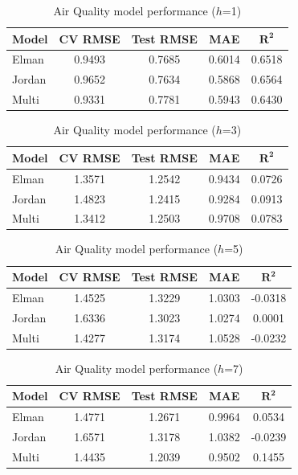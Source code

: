 \documentclass[conference]{IEEEtran}
\begin{document}
\begin{table}[H]
\centering
\caption{Air Quality model performance ($h$=1)}
\label{tab:aq_h1}
\begin{tabular}{lcccc}
\toprule
\textbf{Model} & \textbf{CV RMSE} & \textbf{Test RMSE} & \textbf{MAE} & \(\mathbf{R^2}\) \\
\midrule
Elman  & 0.9493 & 0.7685 & 0.6014 & 0.6518 \\
Jordan & 0.9652 & 0.7634 & 0.5868 & 0.6564 \\
Multi  & 0.9331 & 0.7781 & 0.5943 & 0.6430 \\
\bottomrule
\end{tabular}
\end{table}

\begin{table}[H]
\centering
\caption{Air Quality model performance ($h$=3)}
\label{tab:aq_h3}
\begin{tabular}{lcccc}
\toprule
\textbf{Model} & \textbf{CV RMSE} & \textbf{Test RMSE} & \textbf{MAE} & \(\mathbf{R^2}\) \\
\midrule
Elman  & 1.3571 & 1.2542 & 0.9434 & 0.0726 \\
Jordan & 1.4823 & 1.2415 & 0.9284 & 0.0913 \\
Multi  & 1.3412 & 1.2503 & 0.9708 & 0.0783 \\
\bottomrule
\end{tabular}
\end{table}

\begin{table}[H]
\centering
\caption{Air Quality model performance ($h$=5)}
\label{tab:aq_h5}
\begin{tabular}{lcccc}
\toprule
\textbf{Model} & \textbf{CV RMSE} & \textbf{Test RMSE} & \textbf{MAE} & \(\mathbf{R^2}\) \\
\midrule
Elman  & 1.4525 & 1.3229 & 1.0303 & -0.0318 \\
Jordan & 1.6336 & 1.3023 & 1.0274 & 0.0001 \\
Multi  & 1.4277 & 1.3174 & 1.0528 & -0.0232 \\
\bottomrule
\end{tabular}
\end{table}

\begin{table}[H]
\centering
\caption{Air Quality model performance ($h$=7)}
\label{tab:aq_h7}
\begin{tabular}{lcccc}
\toprule
\textbf{Model} & \textbf{CV RMSE} & \textbf{Test RMSE} & \textbf{MAE} & \(\mathbf{R^2}\) \\
\midrule
Elman  & 1.4771 & 1.2671 & 0.9964 & 0.0534 \\
Jordan & 1.6571 & 1.3178 & 1.0382 & -0.0239 \\
Multi  & 1.4435 & 1.2039 & 0.9502 & 0.1455 \\
\bottomrule
\end{tabular}
\end{table}
\end{document}
